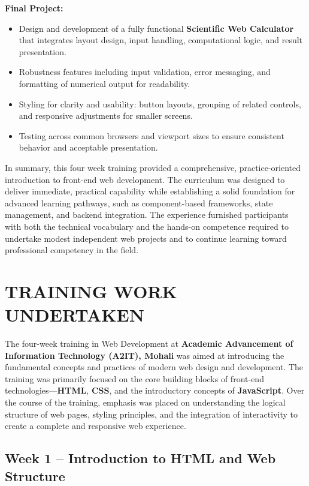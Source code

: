 \documentclass[a4paper,12pt,oneside]{report}
\numberwithin{equation}{chapter}
\numberwithin{figure}{chapter}
\numberwithin{table}{chapter}
\begin{document}
\textbf{Final Project:}
\begin{itemize}
    \item Design and development of a fully functional \textbf{Scientific Web Calculator} that integrates layout design, input handling, computational logic, and result presentation.
    \item Robustness features including input validation, error messaging, and formatting of numerical output for readability.
    \item Styling for clarity and usability: button layouts, grouping of related controls, and responsive adjustments for smaller screens.
    \item Testing across common browsers and viewport sizes to ensure consistent behavior and acceptable presentation.
\end{itemize}

In summary, this four week training provided a comprehensive, practice-oriented introduction to front-end web development. The curriculum was designed to deliver immediate, practical capability while establishing a solid foundation for advanced learning pathways, such as component-based frameworks, state management, and backend integration. The experience furnished participants with both the technical vocabulary and the hands-on competence required to undertake modest independent web projects and to continue learning toward professional competency in the field.


\newpage
\chapter{TRAINING WORK UNDERTAKEN}

The four-week training in Web Development at \textbf{Academic Advancement of Information Technology (A2IT), Mohali} was aimed at introducing the fundamental concepts and practices of modern web design and development. The training was primarily focused on the core building blocks of front-end technologies—\textbf{HTML}, \textbf{CSS}, and the introductory concepts of \textbf{JavaScript}. Over the course of the training, emphasis was placed on understanding the logical structure of web pages, styling principles, and the integration of interactivity to create a complete and responsive web experience.

\vspace{5mm}
\noindent
\section{Week 1 – Introduction to HTML and Web Structure}
\end{document}

